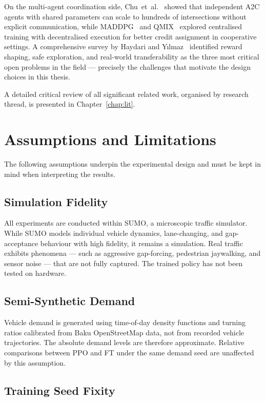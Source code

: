 \documentclass[12pt,oneside,a4paper]{report}
\newcommand{\ppo}{\textsc{PPO}}
\newcommand{\ft}{\textsc{FT}}
\begin{document}
On the multi-agent coordination side, Chu~et~al.~\cite{chu2020marl}
showed that independent A2C agents with shared parameters can scale
to hundreds of intersections without explicit communication, while
MADDPG~\cite{maddpg2017} and QMIX~\cite{qmix2018} explored
centralised training with decentralised execution for better
credit assignment in cooperative settings.  A comprehensive
survey by Haydari and Y{\i}lmaz~\cite{haydari2022survey} identified
reward shaping, safe exploration, and real-world transferability
as the three most critical open problems in the field --- precisely
the challenges that motivate the design choices in this thesis.

A detailed critical review of all significant related work,
organised by research thread, is presented in Chapter~\ref{chap:lit}.

\section{Assumptions and Limitations}
\label{sec:assumptions}

The following assumptions underpin the experimental design and
must be kept in mind when interpreting the results.

\subsection*{Simulation Fidelity}

All experiments are conducted within SUMO, a microscopic traffic
simulator.  While SUMO models individual vehicle dynamics,
lane-changing, and gap-acceptance behaviour with high fidelity,
it remains a simulation.  Real traffic exhibits phenomena ---
such as aggressive gap-forcing, pedestrian jaywalking, and
sensor noise --- that are not fully captured.  The trained policy
has not been tested on hardware.

\subsection*{Semi-Synthetic Demand}

Vehicle demand is generated using time-of-day density functions
and turning ratios calibrated from Baku OpenStreetMap data,
not from recorded vehicle trajectories.  The absolute demand levels
are therefore approximate.  Relative comparisons between \ppo{} and
\ft{} under the same demand seed are unaffected by this assumption.

\subsection*{Training Seed Fixity}
\end{document}
